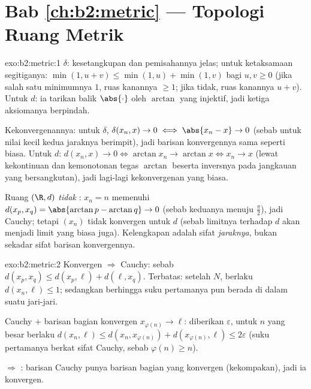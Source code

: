 \section*{Bab \ref{ch:b2:metric} --- Topologi Ruang Metrik}

\begin{solution}{exo:b2:metric:1}
$\delta$: kesetangkupan dan pemisahannya jelas; untuk ketaksamaan
segitiganya: $\min(1, u + v) \leq \min(1,u) + \min(1,v)$ bagi $u, v \geq
0$ (jika salah satu minimumnya $1$, ruas kanannya $\geq 1$; jika tidak,
ruas kanannya $u + v$). Untuk $d$: ia tarikan balik $\abs{\cdot}$ oleh
$\arctan$ yang injektif, jadi ketiga aksiomanya berpindah.

Kekonvergenannya: untuk $\delta$, $\delta(x_n, x) \to 0 \iff \abs{x_n -
x} \to 0$ (sebab untuk nilai kecil kedua jaraknya berimpit), jadi barisan
konvergennya sama seperti biasa. Untuk $d$: $d(x_n, x) \to 0 \iff \arctan
x_n \to \arctan x \iff x_n \to x$ (lewat kekontinuan dan kemonotonan
tegas $\arctan$ beserta inversnya pada jangkauan yang bersangkutan), jadi
lagi-lagi kekonvergenan yang biasa.

Ruang $(\R, d)$ \emph{tidak} : $x_n = n$ memenuhi $d(x_p, x_q)
= \abs{\arctan p - \arctan q} \to 0$ (sebab keduanya menuju $\frac\pi2$),
jadi Cauchy; tetapi $(x_n)$ tidak konvergen untuk $d$ (sebab limitnya
terhadap $d$ akan menjadi limit yang biasa juga). Kelengkapan adalah
sifat \emph{jaraknya}, bukan sekadar sifat barisan konvergennya.
\end{solution}

\begin{solution}{exo:b2:metric:2}
Konvergen $\Rightarrow$ Cauchy: sebab $d(x_p, x_q) \leq d(x_p, \ell) +
d(\ell, x_q)$. Terbatas: setelah $N$, berlaku $d(x_n, \ell) \leq 1$;
sedangkan berhingga suku pertamanya pun berada di dalam suatu jari-jari.

Cauchy $+$ barisan bagian konvergen $x_{\varphi(n)} \to \ell$: diberikan
$\varepsilon$, untuk $n$ yang besar berlaku $d(x_n, \ell) \leq d(x_n,
x_{\varphi(n)}) + d(x_{\varphi(n)}, \ell) \leq 2\varepsilon$ (suku
pertamanya berkat sifat Cauchy, sebab $\varphi(n) \geq n$).

 $\Rightarrow$ : barisan Cauchy punya barisan bagian yang
konvergen (kekompakan), jadi ia konvergen.
\end{solution}

